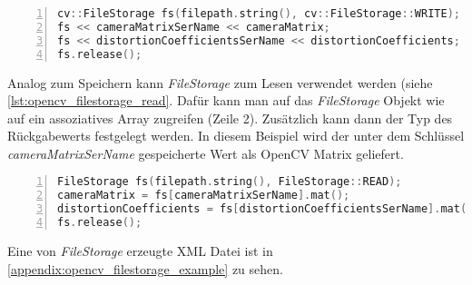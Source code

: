 \begin{lstlisting}[language=c++, numbers=left, breaklines=true, breakatwhitespace=false, label=lst:opencv_filestorage, caption=Schreiben mit OpenCV Filestorage]
cv::FileStorage fs(filepath.string(), cv::FileStorage::WRITE);
fs << cameraMatrixSerName << cameraMatrix;
fs << distortionCoefficientsSerName << distortionCoefficients;
fs.release();
\end{lstlisting}

Analog zum Speichern kann \emph{FileStorage} zum Lesen verwendet werden (siehe \autoref{lst:opencv_filestorage_read}.
Dafür kann man auf das \emph{FileStorage} Objekt wie auf ein assoziatives Array zugreifen (Zeile 2).
Zusätzlich kann dann der Typ des Rückgabewerts festgelegt werden.
In diesem Beispiel wird der unter dem Schlüssel \emph{cameraMatrixSerName} gespeicherte Wert als OpenCV Matrix geliefert.

\begin{lstlisting}[language=c++, numbers=left, breaklines=true, breakatwhitespace=false, label=lst:opencv_filestorage_read, caption=Lesen mit OpenCV Filestorage]
FileStorage fs(filepath.string(), FileStorage::READ);
cameraMatrix = fs[cameraMatrixSerName].mat();
distortionCoefficients = fs[distortionCoefficientsSerName].mat();
fs.release();
\end{lstlisting}


Eine von \emph{FileStorage} erzeugte XML Datei ist in \autoref{appendix:opencv_filestorage_example}  zu sehen.